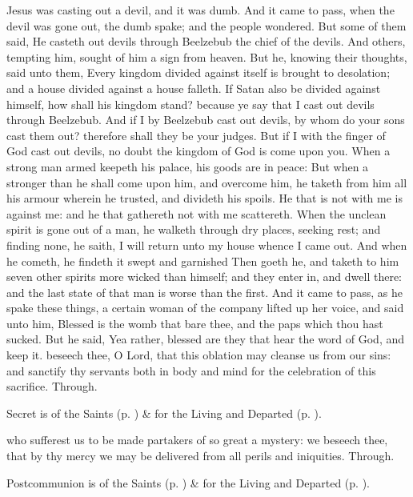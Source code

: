  Jesus was casting out a devil, and it was dumb. And it came to pass, when the devil was gone out, the dumb spake; and the people wondered. But some of them said, He casteth out devils through Beelzebub the chief of the devils. And others, tempting him, sought of him a sign from heaven. But he, knowing their thoughts, said unto them, Every kingdom divided against itself is brought to desolation; and a house divided against a house falleth. If Satan also be divided against himself, how shall his kingdom stand? because ye say that I cast out devils through Beelzebub. And if I by Beelzebub cast out devils, by whom do your sons cast them out? therefore shall they be your judges. But if I with the finger of God cast out devils, no doubt the kingdom of God is come upon you. When a strong man armed keepeth his palace, his goods are in peace: But when a stronger than he shall come upon him, and overcome him, he taketh from him all his armour wherein he trusted, and divideth his spoils. He that is not with me is against me: and he that gathereth not with me scattereth. When the unclean spirit is gone out of a man, he walketh through dry places, seeking rest; and finding none, he saith, I will return unto my house whence I came out. And when he cometh, he findeth it swept and garnished Then goeth he, and taketh to him seven other spirits more wicked than himself; and they enter in, and dwell there: and the last state of that man is worse than the first. And it came to pass, as he spake these things, a certain woman of the company lifted up her voice, and said unto him, Blessed is the womb that bare thee, and the paps which thou hast sucked. But he said, Yea rather, blessed are they that hear the word of God, and keep it.
\secret
{} beseech thee, O Lord, that this oblation may cleanse us from our sins: and sanctify thy servants both in body and mind for the celebration of this sacrifice. Through.
\begin{rubric}
     Secret is of the Saints (p. \pageref{SPSaints}) \&  for the Living and Departed (p. \pageref{SPLivingDeparted}).
\end{rubric}
\postcommunion
{} who sufferest us to be made partakers of so great a mystery: we beseech thee, that by thy mercy we may be delivered from all perils and iniquities. Through.
\begin{rubric}
     Postcommunion is of the Saints (p. \pageref{SPSaints}) \&  for the Living and Departed (p. \pageref{SPLivingDeparted}).
\end{rubric}


